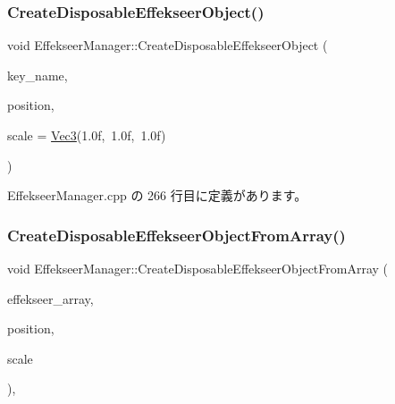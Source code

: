 \subsubsection{\texorpdfstring{Create\+Disposable\+Effekseer\+Object()}{CreateDisposableEffekseerObject()}}
{\footnotesize\ttfamily void Effekseer\+Manager\+::\+Create\+Disposable\+Effekseer\+Object (\begin{DoxyParamCaption}\item[{const std\+::string $\ast$}]{key\+\_\+name,  }\item[{\mbox{\hyperlink{_vector3_d_8h_ab16f59e4393f29a01ec8b9bbbabbe65d}{Vec3}}}]{position,  }\item[{\mbox{\hyperlink{_vector3_d_8h_ab16f59e4393f29a01ec8b9bbbabbe65d}{Vec3}}}]{scale = {\ttfamily \mbox{\hyperlink{_vector3_d_8h_ab16f59e4393f29a01ec8b9bbbabbe65d}{Vec3}}(1.0f,~1.0f,~1.0f)} }\end{DoxyParamCaption})\hspace{0.3cm}{\ttfamily [static]}}



 Effekseer\+Manager.\+cpp の 266 行目に定義があります。

\mbox{\label{class_effekseer_manager_ab8fd5fdd35e1336974f217797c010ee3}} 
\subsubsection{\texorpdfstring{Create\+Disposable\+Effekseer\+Object\+From\+Array()}{CreateDisposableEffekseerObjectFromArray()}}
{\footnotesize\ttfamily void Effekseer\+Manager\+::\+Create\+Disposable\+Effekseer\+Object\+From\+Array (\begin{DoxyParamCaption}\item[{\mbox{\hyperlink{class_effekseer_array}{Effekseer\+Array}} $\ast$}]{effekseer\+\_\+array,  }\item[{\mbox{\hyperlink{_vector3_d_8h_ab16f59e4393f29a01ec8b9bbbabbe65d}{Vec3}}}]{position,  }\item[{\mbox{\hyperlink{_vector3_d_8h_ab16f59e4393f29a01ec8b9bbbabbe65d}{Vec3}}}]{scale }\end{DoxyParamCaption})\hspace{0.3cm}{\ttfamily [static]}, {\ttfamily [private]}}



